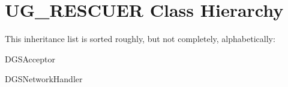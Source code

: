 \section{UG\_\-RESCUER Class Hierarchy}
This inheritance list is sorted roughly, but not completely, alphabetically:\begin{CompactList}
\item DGSAcceptor\item DGSNetwork\-Handler\item {}
\begin{CompactList}
\item {}
\item {}
\end{CompactList}
\end{CompactList}
